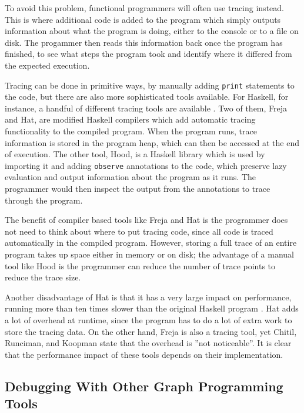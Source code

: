\documentclass[authoryearcitations]{UoYCSproject}
\begin{document}
To avoid this problem, functional programmers will often use tracing instead.
This is where additional code is added to the program which simply outputs
information about what the program is doing, either to the console or to a file on
disk. The progammer then reads this information back once the program has finished,
to see what steps the program took and identify where it differed from the
expected execution.

Tracing can be done in primitive ways, by manually adding \texttt{print}
statements to the code, but there are also more sophisticated tools available.
For Haskell, for instance, a handful of different tracing tools are
available \citep{runciman2000}. Two of them, Freja and Hat, are modified Haskell
compilers which add automatic tracing functionality to the compiled program. When
the program runs, trace information is stored in the program heap, which can then
be accessed at the end of execution. The other tool, Hood, is a Haskell library
which is used by importing it and adding \texttt{observe} annotations to the code,
which preserve lazy evaluation and output information about the program as it runs.
The programmer would then inspect the output from the annotations to trace through
the program.

The benefit of compiler based tools like Freja and Hat is the programmer does not
need to think about where to put tracing code, since all code is traced automatically
in the compiled program. However, storing a full trace of an entire program takes
up space either in memory or on disk; the advantage of a manual tool like Hood is
the programmer can reduce the number of trace points to reduce the trace size.

Another disadvantage of Hat is that it has a very large impact on performance,
running more than ten times slower than the original Haskell program \citep{runciman2000}.
Hat adds a lot of overhead at runtime, since the program has to do a lot of
extra work to store the tracing data. On the other hand, Freja is also a tracing
tool, yet Chitil, Runciman, and Koopman state that the overhead is ''not
noticeable''. It is clear that the performance impact of these tools depends on
their implementation.


\subsection{Debugging With Other Graph Programming Tools}
\label{sec:DebuggingOtherGraphProgrammingTools}
\end{document}
